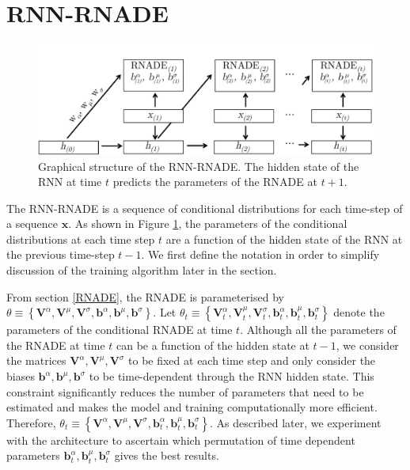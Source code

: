 \documentclass{article} %
\begin{document}
\section{RNN-RNADE}
\label{RNN-RNADE}

\begin{figure}
	\centering
    \includegraphics[scale=0.65]{RNN-RNADE.pdf}
    \caption{Graphical structure of the RNN-RNADE. The hidden state of the RNN at time $t$ predicts the parameters of the RNADE at $t+1$. }
    \label{fig:rnn-rnade}
\end{figure}


The RNN-RNADE is a sequence of conditional distributions for each time-step of a sequence $\mathbf{x}$. As shown in Figure \ref{fig:rnn-rnade}, the parameters of the conditional distributions at each time step $t$ are a function of the hidden state of the RNN at the previous time-step $t-1$. We first define the notation in order to simplify discussion of the training algorithm later in the section. 

From section \ref{RNADE}, the RNADE is parameterised by $ \theta \equiv \left\{ \mathbf{V}^{\alpha},\mathbf{V}^{\mu},\mathbf{V}^{\sigma},\mathbf{b}^{\alpha},\mathbf{b}^{\mu},\mathbf{b}^{\sigma} \right\}$. Let  $ \theta_t \equiv \left\{ \mathbf{V}^{\alpha}_{t},\mathbf{V}^{\mu}_{t},\mathbf{V}^{\sigma}_{t},\mathbf{b}^{\alpha}_{t},\mathbf{b}^{\mu}_{t},\mathbf{b}^{\sigma}_{t} \right\}$ denote the parameters of the conditional RNADE at time $t$. Although all the parameters of the RNADE at time $t$ can be a function of the hidden state at $t-1$, we consider the matrices $ \mathbf{V}^{\alpha},\mathbf{V}^{\mu},\mathbf{V}^{\sigma}$ to be fixed at each time step and only consider the biases $\mathbf{b}^{\alpha},\mathbf{b}^{\mu},\mathbf{b}^{\sigma}$ to be time-dependent through the RNN hidden state. This constraint significantly reduces the number of parameters that need to be estimated and makes the model and training computationally more efficient. 
Therefore, $ \theta_t \equiv \left\{ \mathbf{V}^{\alpha},\mathbf{V}^{\mu},\mathbf{V}^{\sigma},\mathbf{b}^{\alpha}_{t},\mathbf{b}^{\mu}_{t},\mathbf{b}^{\sigma}_{t} \right\}$. As described later, we experiment with the architecture to ascertain which permutation of time dependent parameters $\mathbf{b}^{\alpha}_{t},\mathbf{b}^{\mu}_{t},\mathbf{b}^{\sigma}_{t}$ gives the best results.  
\end{document}

